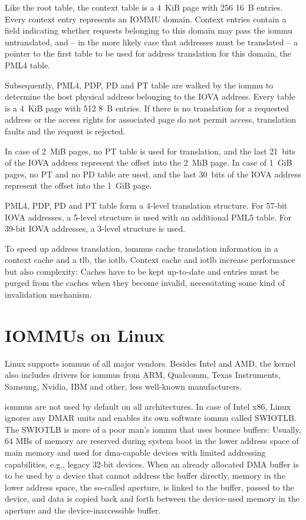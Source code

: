 Like the root table, the context table is a 4~KiB page with 256 16~B entries.
Every context entry represents an IOMMU domain. Context entries contain a field
indicating whether requests belonging to this domain may pass the \ac{iommu}
untranslated, and -- in the more likely case that addresses must be translated
-- a pointer to the first table to be used for address translation for this
domain, the PML4 table.

Subsequently, PML4, PDP, PD and PT table are walked by the \ac{iommu} to
determine the host physical address belonging to the IOVA address. Every table
is a 4~KiB page with 512 8~B entries. If there is no translation for a requested
address or the access rights for associated page do not permit access,
translation faults and the request is rejected.

In case of 2~MiB pages, no PT table is used for translation, and the last
21~bits of the IOVA address represent the offset into the 2~MiB page. In case of
1~GiB pages, no PT and no PD table are used, and the last 30~bits of the IOVA
address represent the offset into the 1~GiB page.

PML4, PDP, PD and PT table form a 4-level translation structure. For 57-bit IOVA
addresses, a 5-level structure is used with an additional PML5 table. For 39-bit
IOVA addresses, a 3-level structure is used.

To speed up address translation, \acp{iommu} cache translation information in a
context cache and a \ac{tlb}, the \ac{iotlb}. Context cache and \ac{iotlb}
increase performance but also complexity: Caches have to be kept up-to-date and
entries must be purged from the caches when they become invalid, necessitating
some kind of invalidation mechanism.


\section{IOMMUs on Linux}
\label{sec:iommus_on_linux}

Linux supports \acp{iommu} of all major vendors. Besides Intel and AMD, the
kernel also includes drivers for \acp{iommu} from ARM, Qualcomm, Texas
Instruments, Samsung, Nvidia, IBM and other, less well-known manufacturers.

\acp{iommu} are not used by default on all architectures. In case of Intel x86,
Linux ignores any DMAR units and enables its own software \ac{iommu} called
SWIOTLB. The SWIOTLB is more of a poor man's \ac{iommu} that uses bounce
buffers: Usually, 64 MBs of memory are reserved during system boot in the lower
address space of main memory and used for \ac{dma}-capable devices with limited
addressing capabilities, e.g., legacy 32-bit devices. When an already allocated
DMA buffer is to be used by a device that cannot address the buffer directly,
memory in the lower address space, the so-called aperture, is linked to the
buffer, passed to the device, and data is copied back and forth between the
device-used memory in the aperture and the device-inaccessible buffer.

